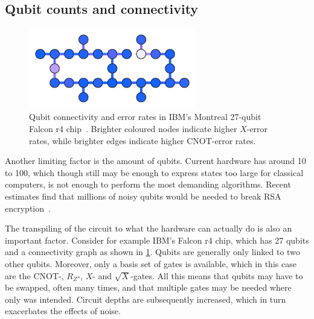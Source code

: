 \subsection{Qubit counts and connectivity}
\label{sec:qubit_counts}
\begin{figure}
  \centering
  \includegraphics[width=0.65\textwidth]{connectivity.pdf}
  \caption[
    Qubit connectivity and error rates example.
  ]{
    Qubit connectivity and error rates in IBM's Montreal 27-qubit Falcon r4 chip~\autocite{connectivity}.
    Brighter coloured nodes indicate higher $X$-error rates, while brighter edges indicate higher CNOT-error rates.
  }
  \label{fig:connectivity}
\end{figure}

Another limiting factor is the amount of qubits.
Current hardware has around 10 to 100, which though still may be enough to express states too large for classical computers, is not enough to perform the most demanding algorithms.
Recent estimates find that millions of noisy qubits would be needed to break RSA encryption~\autocite{gidney2021}.

The transpiling of the circuit to what the hardware can actually do is also an important factor.
Consider for example IBM's Falcon r4 chip, which has 27 qubits and a connectivity graph as shown in \cref{fig:connectivity}.
Qubits are generally only linked to two other qubits.
Moreover, only a basis set of gates is available, which in this case are the CNOT-, $R_Z$-, $X$- and $\sqrt{X}$-gates.
All this means that qubits may have to be swapped, often many times, and that multiple gates may be needed where only was intended.
Circuit depths are subsequently increased, which in turn exacerbates the effects of noise.